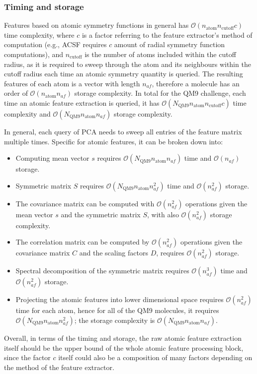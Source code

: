 \documentclass[12pt]{article}
\begin{document}
\subsubsection{Timing and storage}
Features based on atomic symmetry functions in general has $\mathcal{O}(n_\text{atom}n_\text{cutoff}c)$ time complexity, where $c$ is a factor referring to the feature extractor's method of computation (e.g., ACSF requires $c$ amount of radial symmetry function computations), and $n_\text{cutoff}$ is the number of atoms included within the cutoff radius, as it is required to sweep through the atom and its neighbours within the cutoff radius each time an atomic symmetry quantity is queried. The resulting features of each atom is a vector with length $n_{af}$, therefore a molecule has an order of $\mathcal{O}(n_\text{atom}n_{af})$ storage complexity. In total for the QM9 challenge, each time an atomic feature extraction is queried, it has $\mathcal{O}(N_\text{QM9}n_\text{atom}n_\text{cutoff}c)$ time complexity and $\mathcal{O}(N_\text{QM9}n_\text{atom}n_{af})$ storage complexity.

In general, each query of PCA needs to sweep all entries of the feature matrix multiple times. Specific for atomic features, it can be broken down into:
\begin{itemize}
	\item Computing mean vector $s$ requires $\mathcal{O}(N_\text{QM9}n_\text{atom}n_{af})$ time and $\mathcal{O}(n_{af})$ storage.
	\item Symmetric matrix $S$ requires $\mathcal{O}(N_\text{QM9}n_\text{atom}n^2_{af})$ time and $\mathcal{O}(n^2_{af})$ storage.
	\item The covariance matrix can be computed with $\mathcal{O}(n^2_{af})$ operations given the mean vector $s$ and the symmetric matrix $S$, with also $\mathcal{O}(n^2_{af})$ storage complexity.
	\item The correlation matrix can be computed by $\mathcal{O}(n^2_{af})$ operations given the covariance matrix $C$ and the scaling factors $D$, requires $\mathcal{O}(n^2_{af})$ storage.
	\item Spectral decomposition of the symmetric matrix requires $\mathcal{O}(n^3_{af})$ time and $\mathcal{O}(n^2_{af})$ storage.
	\item Projecting the atomic features into lower dimensional space requires $\mathcal{O}(n^2_{af})$ time for each atom, hence for all of the QM9 molecules, it requires $\mathcal{O}(N_\text{QM9}n_\text{atom}n^2_{af})$; the storage complexity is $\mathcal{O}(N_\text{QM9}n_\text{atom}n_{af})$.
\end{itemize}
Overall, in terms of the timing and storage, the raw atomic feature extraction itself should be the upper bound of the whole atomic feature processing block, since the factor $c$ itself could also be a composition of many factors depending on the method of the feature extractor.
\end{document}
